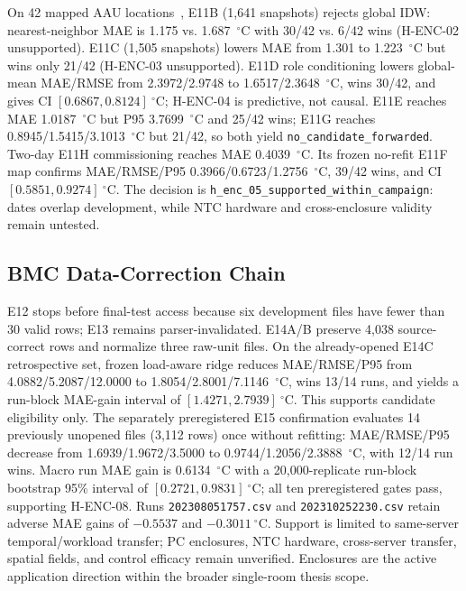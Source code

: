 \documentclass[conference,a4paper]{IEEEtran}
\begin{document}
On 42 mapped AAU locations~\cite{melgaard2026aau,sarikaya2025energy}, E11B (1,641 snapshots) rejects global IDW: nearest-neighbor MAE is 1.175 vs. 1.687~$^\circ$C with 30/42 vs. 6/42 wins (H-ENC-02 unsupported). E11C (1,505 snapshots) lowers MAE from 1.301 to 1.223~$^\circ$C but wins only 21/42 (H-ENC-03 unsupported). E11D role conditioning lowers global-mean MAE/RMSE from 2.3972/2.9748 to 1.6517/2.3648~$^\circ$C, wins 30/42, and gives CI $[0.6867,0.8124]~^\circ$C; H-ENC-04 is predictive, not causal. E11E reaches MAE 1.0187~$^\circ$C but P95 3.7699~$^\circ$C and 25/42 wins; E11G reaches 0.8945/1.5415/3.1013~$^\circ$C but 21/42, so both yield \texttt{no\_candidate\_forwarded}. Two-day E11H commissioning reaches MAE 0.4039~$^\circ$C. Its frozen no-refit E11F map confirms MAE/RMSE/P95 0.3966/0.6723/1.2756~$^\circ$C, 39/42 wins, and CI $[0.5851,0.9274]~^\circ$C. The decision is \texttt{h\_enc\_05\_supported\_within\_campaign}: dates overlap development, while NTC hardware and cross-enclosure validity remain untested.

\subsection{BMC Data-Correction Chain}

E12 stops before final-test access because six development files have fewer than 30 valid rows; E13 remains parser-invalidated. E14A/B preserve 4,038 source-correct rows and normalize three raw-unit files. On the already-opened E14C retrospective set, frozen load-aware ridge reduces MAE/RMSE/P95 from 4.0882/5.2087/12.0000 to 1.8054/2.8001/7.1146~$^\circ$C, wins 13/14 runs, and yields a run-block MAE-gain interval of $[1.4271,2.7939]~^\circ$C. This supports candidate eligibility only. The separately preregistered E15 confirmation evaluates 14 previously unopened files (3,112 rows) once without refitting: MAE/RMSE/P95 decrease from 1.6939/1.9672/3.5000 to 0.9744/1.2056/2.3888~$^\circ$C, with 12/14 run wins. Macro run MAE gain is 0.6134~$^\circ$C with a 20,000-replicate run-block bootstrap 95\% interval of $[0.2721,0.9831]~^\circ$C; all ten preregistered gates pass, supporting H-ENC-08. Runs \texttt{202308051757.csv} and \texttt{202310252230.csv} retain adverse MAE gains of $-0.5537$ and $-0.3011~^\circ$C. Support is limited to same-server temporal/workload transfer; PC enclosures, NTC hardware, cross-server transfer, spatial fields, and control efficacy remain unverified. Enclosures are the active application direction within the broader single-room thesis scope.
\end{document}
